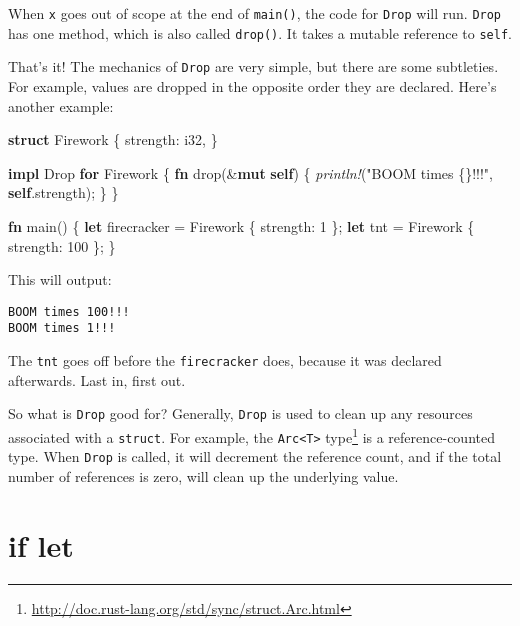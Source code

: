 \documentclass[a4paper,]{book}
\newenvironment{Shaded}{\begin{snugshade}}{\end{snugshade}}
\newcommand{\KeywordTok}[1]{\textcolor[rgb]{0.13,0.29,0.53}{\textbf{{#1}}}}
\newcommand{\DataTypeTok}[1]{\textcolor[rgb]{0.13,0.29,0.53}{{#1}}}
\newcommand{\DecValTok}[1]{\textcolor[rgb]{0.00,0.00,0.81}{{#1}}}
\newcommand{\StringTok}[1]{\textcolor[rgb]{0.31,0.60,0.02}{{#1}}}
\newcommand{\BuiltInTok}[1]{{#1}}
\newcommand{\PreprocessorTok}[1]{\textcolor[rgb]{0.56,0.35,0.01}{\textit{{#1}}}}
\newcommand{\NormalTok}[1]{{#1}}
\renewcommand{\href}[2]{#2\footnote{\url{#1}}}
\begin{document}
When \texttt{x} goes out of scope at the end of \texttt{main()}, the
code for \texttt{Drop} will run. \texttt{Drop} has one method, which is
also called \texttt{drop()}. It takes a mutable reference to
\texttt{self}.

That's it! The mechanics of \texttt{Drop} are very simple, but there are
some subtleties. For example, values are dropped in the opposite order
they are declared. Here's another example:

\begin{Shaded}
\begin{Highlighting}[]
\KeywordTok{struct} \NormalTok{Firework \{}
    \NormalTok{strength: }\DataTypeTok{i32}\NormalTok{,}
\NormalTok{\}}

\KeywordTok{impl} \BuiltInTok{Drop} \KeywordTok{for} \NormalTok{Firework \{}
    \KeywordTok{fn} \NormalTok{drop(&}\KeywordTok{mut} \KeywordTok{self}\NormalTok{) \{}
        \PreprocessorTok{println!}\NormalTok{(}\StringTok{"BOOM times \{\}!!!"}\NormalTok{, }\KeywordTok{self}\NormalTok{.strength);}
    \NormalTok{\}}
\NormalTok{\}}

\KeywordTok{fn} \NormalTok{main() \{}
    \KeywordTok{let} \NormalTok{firecracker = Firework \{ strength: }\DecValTok{1} \NormalTok{\};}
    \KeywordTok{let} \NormalTok{tnt = Firework \{ strength: }\DecValTok{100} \NormalTok{\};}
\NormalTok{\}}
\end{Highlighting}
\end{Shaded}

This will output:

\begin{verbatim}
BOOM times 100!!!
BOOM times 1!!!
\end{verbatim}

The \texttt{tnt} goes off before the \texttt{firecracker} does, because
it was declared afterwards. Last in, first out.

So what is \texttt{Drop} good for? Generally, \texttt{Drop} is used to
clean up any resources associated with a \texttt{struct}. For example,
the
\href{http://doc.rust-lang.org/std/sync/struct.Arc.html}{\texttt{Arc\textless{}T\textgreater{}}
type} is a reference-counted type. When \texttt{Drop} is called, it will
decrement the reference count, and if the total number of references is
zero, will clean up the underlying value.

\hypertarget{sec--if-let}{\section{if let}\label{sec--if-let}}
\end{document}
